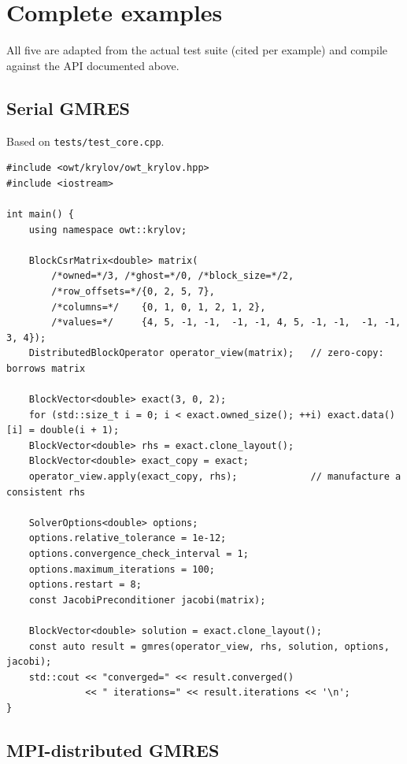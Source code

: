 \documentclass[11pt,a4paper]{report}
\begin{document}
\chapter{Complete examples}
\label{sec:11}

All five are adapted from the actual test suite (cited per example) and
compile against the API documented above.

\section{Serial GMRES}
\label{sec:11.1}

Based on \texttt{tests/test\_core.cpp}.

\begin{lstlisting}
#include <owt/krylov/owt_krylov.hpp>
#include <iostream>

int main() {
    using namespace owt::krylov;

    BlockCsrMatrix<double> matrix(
        /*owned=*/3, /*ghost=*/0, /*block_size=*/2,
        /*row_offsets=*/{0, 2, 5, 7},
        /*columns=*/    {0, 1, 0, 1, 2, 1, 2},
        /*values=*/     {4, 5, -1, -1,  -1, -1, 4, 5, -1, -1,  -1, -1, 3, 4});
    DistributedBlockOperator operator_view(matrix);   // zero-copy: borrows matrix

    BlockVector<double> exact(3, 0, 2);
    for (std::size_t i = 0; i < exact.owned_size(); ++i) exact.data()[i] = double(i + 1);
    BlockVector<double> rhs = exact.clone_layout();
    BlockVector<double> exact_copy = exact;
    operator_view.apply(exact_copy, rhs);             // manufacture a consistent rhs

    SolverOptions<double> options;
    options.relative_tolerance = 1e-12;
    options.convergence_check_interval = 1;
    options.maximum_iterations = 100;
    options.restart = 8;
    const JacobiPreconditioner jacobi(matrix);

    BlockVector<double> solution = exact.clone_layout();
    const auto result = gmres(operator_view, rhs, solution, options, jacobi);
    std::cout << "converged=" << result.converged()
              << " iterations=" << result.iterations << '\n';
}
\end{lstlisting}

\section{MPI-distributed GMRES}
\label{sec:11.2}
\end{document}
